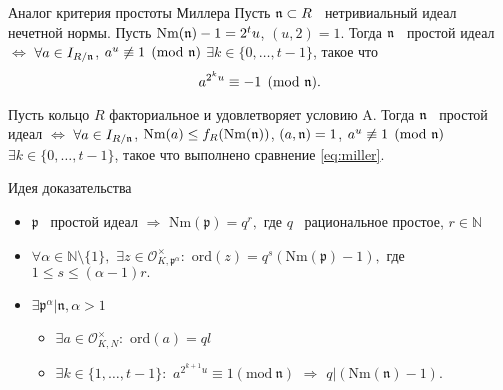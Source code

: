 \documentclass[8pt, xcolor=x11names]{beamer}
\begin{document}
\begin{frame}
    \begin{block}{Аналог критерия простоты Миллера}
        Пусть $\mathfrak{n} \subset R$ \textendash\ нетривиальный идеал нечетной нормы.
        Пусть $\textrm{Nm}(\mathfrak{n}) - 1 = 2^t u$, $(u, 2) = 1$.
        Тогда $\mathfrak{n}$ \textendash\ простой идеал $\Leftrightarrow$ $\forall a \in I_{R/\mathfrak{n}}$, $a^u \not\equiv 1 \pmod{\mathfrak{n}}$ $\exists k\in \{0, \dots, t-1\}$, такое что
        \begin{equation}\label{eq:miller}
            a^{2^{k}u} \equiv -1 \pmod{\mathfrak{n}}.
        \end{equation}
    
        Пусть кольцо $R$ факториальное и удовлетворяет условию A.
        Тогда $\mathfrak{n}$ \textendash\ простой идеал $\Leftrightarrow$ $\forall a \in I_{R/\mathfrak{n}}$, $\textrm{Nm}(a) \le f_R(\textrm{Nm}(\mathfrak{n}))$, $(a, \mathfrak{n}) = 1$, $a^u \not\equiv 1 \pmod{\mathfrak{n}}$ $\exists k\in \{0, \dots, t-1\}$, такое что выполнено сравнение \ref{eq:miller}.
    \end{block}
    
    \begin{block}{Идея доказательства}
        \begin{itemize}
            \item $\mathfrak{p}$ \textendash\ простой идеал $\Rightarrow$ $\textrm{Nm}(\mathfrak{p})=q^r,$ где $q$ \textendash\ рациональное простое, $r \in \mathbb{N}$
            
            \item $\forall \alpha \in \mathbb{N} \setminus \{1\},$ $\exists z \in \mathcal{O}_{K,\mathfrak{p}^{\alpha}}^\times:$ $\textrm{ord}(z)=q^s(\textrm{Nm}(\mathfrak{p})-1),$ где $1 \le s \le (\alpha-1)r.$
            
            \item $\exists \mathfrak{p}^\alpha|\mathfrak{n}, \alpha > 1$
            \begin{itemize}
                \item $\exists a \in \mathcal{O}_{K, N}^\times:$ $\textrm{ord}(a)=ql$
                
                \item $\exists k \in \{1,\ldots, t-1\}:$ $a^{2^{k+1}u} \equiv 1 (\textrm{mod} \ \mathfrak{n})$ $\Rightarrow$ $q|(\textrm{Nm}(\mathfrak{n})-1).$
            \end{itemize}
                

\end{itemize}
\end{block}
\end{frame}
\end{document}
